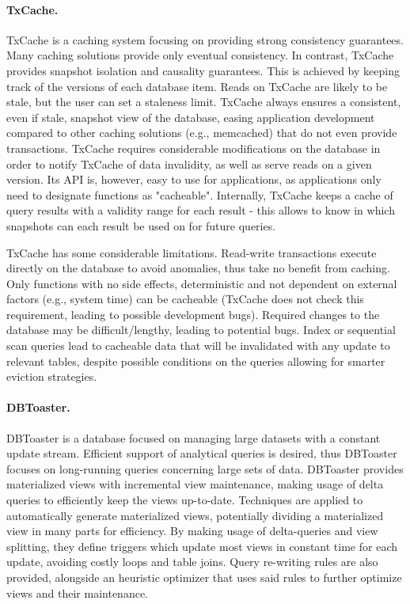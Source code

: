 \paragraph{TxCache.} TxCache \cite{txcache} is a caching system focusing on providing strong consistency guarantees.
Many caching solutions provide only eventual consistency.
In contrast, TxCache provides snapshot isolation and causality guarantees.
This is achieved by keeping track of the versions of each database item.
Reads on TxCache are likely to be stale, but the user can set a staleness limit.
TxCache always ensures a consistent, even if stale, snapshot view of the database, easing application development compared to other caching solutions (e.g., memcached) that do not even provide transactions.
TxCache requires considerable modifications on the database in order to notify TxCache of data invalidity, as well as serve reads on a given version. Its API is, however, easy to use for applications, as applications only need to designate functions as "cacheable".
Internally, TxCache keeps a cache of query results with a validity range for each result - this allows to know in which snapshots can each result be used on for future queries.

TxCache has some considerable limitations.
Read-write transactions execute directly on the database to avoid anomalies, thus take no benefit from caching.
Only functions with no side effects, deterministic and not dependent on external factors (e.g., system time) can be cacheable (TxCache does not check this requirement, leading to possible development bugs).
Required changes to the database may be difficult/lengthy, leading to potential bugs.
Index or sequential scan queries lead to cacheable data that will be invalidated with any update to relevant tables, despite possible conditions on the queries allowing for smarter eviction strategies.

\paragraph{DBToaster.} DBToaster \cite{dbtoaster} is a database focused on managing large datasets with a constant update stream.
Efficient support of analytical queries is desired, thus DBToaster focuses on long-running queries concerning large sets of data.
DBToaster provides materialized views with incremental view maintenance, making usage of delta queries to efficiently keep the views up-to-date.
Techniques are applied to automatically generate materialized views, potentially dividing a materialized view in many parts for efficiency.
By making usage of delta-queries and view splitting, they define triggers which update most views in constant time for each update, avoiding costly loops and table joins.
Query re-writing rules are also provided, alongside an heuristic optimizer that uses said rules to further optimize views and their maintenance.

